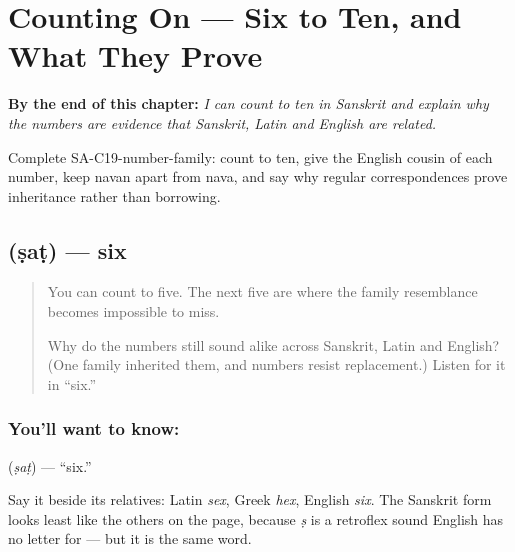 
\chapter{Counting On --- Six to Ten, and What They Prove}
\label{ch:sa-numbers-6-10}

\begin{chapteropening}
\textbf{By the end of this chapter:} \emph{I can count to ten in Sanskrit and explain why the numbers are evidence that Sanskrit, Latin and English are related.}

Complete SA-C19-number-family: count to ten, give the English cousin of each number, keep navan apart from nava, and say why regular correspondences prove inheritance rather than borrowing.
\end{chapteropening}

\section[\texorpdfstring{\sk{षट्} (ṣaṭ)}{षट् (ṣaṭ)}]{ (ṣaṭ) — six}

\label{lesson:SA-C19-six}



\begin{quote}
You can count to five. The next five are where the family resemblance becomes impossible to miss.

Why do the numbers still sound alike across Sanskrit, Latin and English? (One family inherited them, and numbers resist replacement.) Listen for it in \textquotedblleft{}six.\textquotedblright{}
\end{quote}

\subsection*{You'll want to know: }
\textbf{} (\emph{ṣaṭ}) — \textquotedblleft{}six.\textquotedblright{}

Say it beside its relatives: Latin \emph{sex}, Greek \emph{hex}, English \emph{six}. The Sanskrit form looks least like the others on the page, because \emph{ṣ} is a retroflex sound English has no letter for — but it is the same word.


